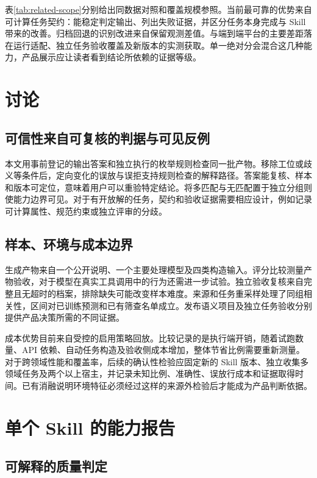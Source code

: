\documentclass[final,5p,twocolumn,10pt]{elsarticle}
\begin{document}
表\ref{tab:related-scope}分别给出同数据对照和覆盖规模参照。当前最可靠的优势来自可计算任务契约：能稳定判定输出、列出失败证据，并区分任务本身完成与 Skill 带来的改善。归档回退的识别改进来自保留观测差值。与端到端平台的主要差距落在运行适配、独立任务验收覆盖及新版本的实测获取。单一绝对分会混合这几种能力，产品展示应让读者看到结论所依赖的证据等级。

\section{讨论}

\subsection{可信性来自可复核的判据与可见反例}

本文用事前登记的输出答案和独立执行的枚举规则检查同一批产物。移除工位或歧义等条件后，定向变化的误放与误拒支持规则检查的解释路径。答案能复核、样本和版本可定位，意味着用户可以重验特定结论。将多匹配与无匹配置于独立分组则使能力边界可见。对于有开放解的任务，契约和验收证据需要相应设计，例如记录可计算属性、规范约束或独立评审的分歧。

\subsection{样本、环境与成本边界}

生成产物来自一个公开说明、一个主要处理模型及四类构造输入。评分比较测量产物验收，对于模型在真实工具调用中的行为还需进一步试验。独立验收复核来自完整且无超时的档案，排除缺失可能改变样本难度。来源和任务重采样处理了同组相关性，区间对已训练预测和已有筛查名单成立。发布语义项目及独立任务验收分别提供产品决策所需的不同证据。

成本优势目前来自受控的启用策略回放。比较记录的是执行端开销，随着试跑数量、API 依赖、自动任务构造及验收侧成本增加，整体节省比例需要重新测量。对于跨领域性能和覆盖率，后续的确认性检验应固定新的 Skill 版本、独立收集多领域任务及两个以上宿主，并记录未知比例、准确性、误放行成本和证据取得时间。已有消融说明环境特征必须经过这样的来源外检验后才能成为产品判断依据。

\section{单个 Skill 的能力报告}\label{sec:profile}

\subsection{可解释的质量判定}
\end{document}
